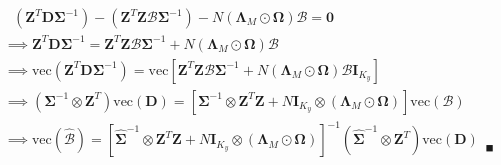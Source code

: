 \begin{align}
& \text{      } \left(\bm{Z}^T \bm{D} \bm{\Sigma}^{-1} \right) - \left(\bm{Z}^T\bm{Z} \bm{\mathcal{B}}\bm{\Sigma}^{-1} \right) - N \left(\bm{\Lambda}_M \odot \bm{\Omega} \right) \bm{\mathcal{B}} = \bm{0} \nonumber \\
& \implies \bm{Z}^T \bm{D} \bm{\Sigma}^{-1} = \bm{Z}^T\bm{Z} \bm{\mathcal{B}}\bm{\Sigma}^{-1} + N \left(\bm{\Lambda}_M \odot \bm{\Omega} \right) \bm{\mathcal{B}} \nonumber \\
& \implies \text{vec}\left(\bm{Z}^T \bm{D} \bm{\Sigma}^{-1}\right) = \text{vec} \left[\bm{Z}^T\bm{Z} \bm{\mathcal{B}}\bm{\Sigma}^{-1} + N \left(\bm{\Lambda}_M \odot \bm{\Omega} \right) \bm{\mathcal{B}} \bm{I}_{K_y}\right] \nonumber \\
& \implies \left(\bm{\Sigma}^{-1} \otimes \bm{Z}^T \right) \text{vec}\left(\bm{D}\right) = \left[\bm{\Sigma}^{-1} \otimes \bm{Z}^T\bm{Z} + N \bm{I}_{K_y} \otimes \left(\bm{\Lambda}_M \odot \bm{\Omega} \right)\right]\text{vec}\left(\bm{\mathcal{B}}\right) \nonumber \\
& \implies \text{vec}\left(\hat{\bm{\mathcal{B}}}\right) = \left[\hat{\bm{\Sigma}}^{-1} \otimes \bm{Z}^T\bm{Z} + N \bm{I}_{K_y} \otimes \left(\bm{\Lambda}_M \odot \bm{\Omega} \right)\right]^{-1}\left(\hat{\bm{\Sigma}}^{-1} \otimes \bm{Z}^T \right) \text{vec}\left(\bm{D}\right)_{\text{  }\blacksquare} \label{betahat2}
\end{align}


